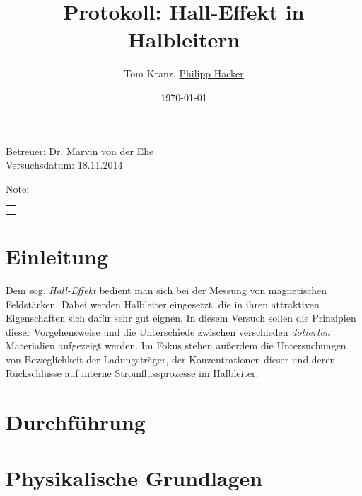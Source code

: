 \documentclass[numbers=noenddot,14pt,a4paper]{scrartcl}
\title{Protokoll: Hall-Effekt in Halbleitern} %
\author{Tom Kranz, \underline{Philipp Hacker}}
\date{\today}
\newcommand{\tilt}[1]{\textit{#1}}
\begin{document}
\maketitle
\begin{center}
Betreuer: Dr. Marvin von der Ehe\\ %
Versuchsdatum: 18.11.2014\\ %
\begin{table}[h]
\centering
Note: %
\begin{tabularx}{1.5cm}{|X|}
\hline \\ \\
\hline
\end{tabularx}
\end{table}
\end{center}
\vspace*{\fill}
\tableofcontents
\vfill
\newpage
\section{Einleitung}
Dem sog. \tilt{Hall-Effekt} bedient man sich bei der Messung von magnetischen Feldstärken. Dabei werden Halbleiter eingesetzt, die in ihren attraktiven Eigenschaften sich dafür sehr gut eignen. In diesem Versuch sollen die Prinzipien dieser Vorgehensweise und die Unterschiede zwischen verschieden \tilt{dotierten} Materialien aufgezeigt werden. Im Fokus stehen außerdem die Untersuchungen von Beweglichkeit der Ladungsträger, der Konzentrationen dieser und deren Rückschlüsse auf interne Stromflussprozesse im Halbleiter.
\section{Durchführung}
\section{Physikalische Grundlagen}
\end{document}
